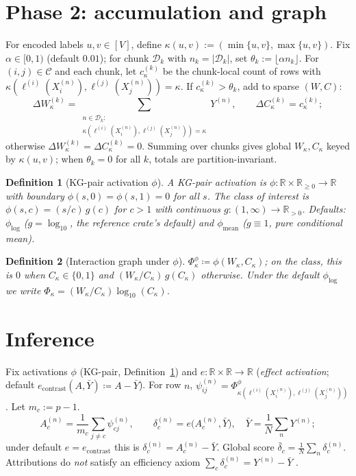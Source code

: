 \documentclass[11pt]{article}
\newtheorem{definition}{Definition}
\begin{document}
\section{Phase 2: accumulation and graph}
For encoded labels $u,v \in [V]$, define $\kappa(u,v):=(\min\{u,v\},\max\{u,v\})$.
Fix $\alpha \in [0,1)$ (default $0.01$); for chunk $\mathcal{D}_k$ with $n_k=|\mathcal{D}_k|$, set $\theta_k:=\lfloor \alpha n_k\rfloor$.
For $(i,j)\in\mathcal{C}$ and each chunk, let $c_\kappa^{(k)}$ be the chunk-local count of rows with $\kappa(\ell^{(i)}(X_i^{(n)}),\ell^{(j)}(X_j^{(n)}))=\kappa$.
If $c_\kappa^{(k)}>\theta_k$, add to sparse $(W,C)$:
\begin{equation}
\label{eq:WC-tight}
\Delta W_{\kappa}^{(k)}=\!\!\sum_{\substack{n\in\mathcal{D}_k:\\ \kappa(\ell^{(i)}(X_i^{(n)}),\ell^{(j)}(X_j^{(n)}))=\kappa}}\!\! Y^{(n)},\qquad
\Delta C_{\kappa}^{(k)}=c_\kappa^{(k)};
\end{equation}
otherwise $\Delta W_{\kappa}^{(k)}=\Delta C_{\kappa}^{(k)}=0$.
Summing over chunks gives global $W_{\kappa},C_{\kappa}$ keyed by $\kappa(u,v)$; when $\theta_k=0$ for all $k$, totals are partition-invariant.

\begin{definition}[KG-pair activation $\phi$]
\label{def:kg-act-tight}
A KG-pair activation is $\phi:\mathbb{R}\times\mathbb{R}_{\ge 0}\to\mathbb{R}$ with boundary $\phi(s,0)=\phi(s,1)=0$ for all $s$.
The class of interest is $\phi(s,c)=(s/c)\,g(c)$ for $c>1$ with continuous $g:(1,\infty)\to\mathbb{R}_{>0}$.
Defaults: $\phi_{\log}$ ($g=\log_{10}$, the reference crate's default) and $\phi_{\mathrm{mean}}$ ($g\equiv 1$, pure conditional mean).
\end{definition}

\begin{definition}[Interaction graph under $\phi$]
$\Phi^\phi_{\kappa}\coloneqq\phi(W_\kappa,C_\kappa)$; on the class, this is $0$ when $C_\kappa\in\{0,1\}$ and $(W_\kappa/C_\kappa)\,g(C_\kappa)$ otherwise.
Under the default $\phi_{\log}$ we write $\Phi_\kappa=(W_\kappa/C_\kappa)\log_{10}(C_\kappa)$.
\end{definition}

\section{Inference}
Fix activations $\phi$ (KG-pair, Definition~\ref{def:kg-act-tight}) and $e:\mathbb{R}\times\mathbb{R}\to\mathbb{R}$ (\emph{effect activation}; default $e_{\mathrm{contrast}}(A,\bar Y)\coloneqq A-\bar Y$).
For row $n$, $\psi_{ij}^{(n)}=\Phi^\phi_{\kappa(\ell^{(i)}(X_i^{(n)}),\ell^{(j)}(X_j^{(n)}))}$.
Let $m_c:=p-1$.
\[
A_c^{(n)}=\frac{1}{m_c}\sum_{j\neq c}\psi_{cj}^{(n)},
\qquad
\delta_c^{(n)}=e\bigl(A_c^{(n)},\bar Y\bigr),\quad \bar{Y}=\frac{1}{N}\sum_n Y^{(n)};
\]
under default $e=e_{\mathrm{contrast}}$ this is $\delta_c^{(n)}=A_c^{(n)}-\bar Y$.
Global score $\bar{\delta}_c=\frac{1}{N}\sum_n\delta_c^{(n)}$.
Attributions do \emph{not} satisfy an efficiency axiom $\sum_c\delta_c^{(n)}=Y^{(n)}-\bar{Y}$ \cite{Lundberg2017}.
\end{document}
